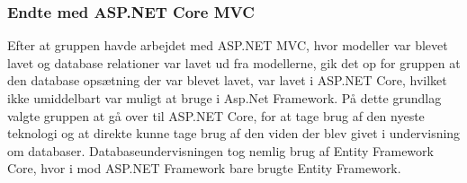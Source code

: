 \subsubsection{Endte med ASP.NET Core MVC}
Efter at gruppen havde arbejdet med ASP.NET MVC, hvor modeller var blevet lavet og database relationer var lavet ud fra modellerne, gik det op for gruppen at den database opsætning der var blevet lavet, var lavet i ASP.NET Core, hvilket ikke umiddelbart var muligt at bruge i Asp.Net  Framework. På dette grundlag valgte gruppen at gå over til ASP.NET Core, for at tage brug af den nyeste teknologi og at direkte kunne tage brug af den viden der blev givet i undervisning om databaser. Databaseundervisningen tog nemlig brug af Entity Framework Core, hvor i mod ASP.NET Framework bare brugte Entity Framework.